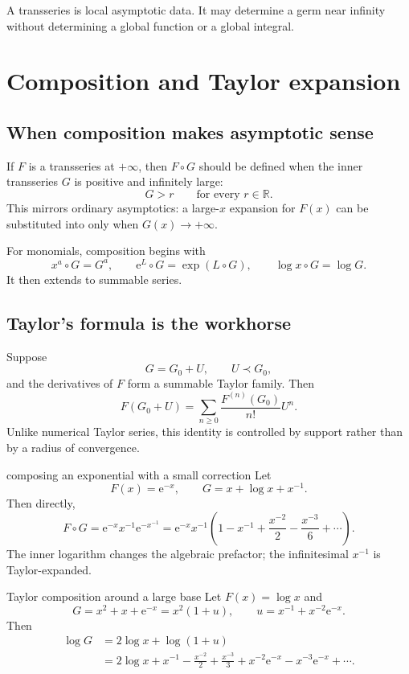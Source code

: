 \documentclass[11pt,openany]{book}
\theoremstyle{plain}
\theoremstyle{definition}
\theoremstyle{remark}
\newcommand{\R}{\mathbb{R}}
\newcommand{\e}{\mathrm{e}}
\begin{document}
\begin{warningbox}
A transseries is local asymptotic data. It may determine a germ near infinity without determining a global function or a global integral.
\end{warningbox}

\chapter{Composition and Taylor expansion}
\label{chap:composition}

\section{When composition makes asymptotic sense}
If $F$ is a transseries at $+\infty$, then $F\circ G$ should be defined when the inner transseries $G$ is positive and infinitely large:
\[
  G>r\qquad\text{for every }r\in\R.
\]
This mirrors ordinary asymptotics: a large-$x$ expansion for $F(x)$ can be substituted into only when $G(x)\to+\infty$.

For monomials, composition begins with
\[
  x^a\circ G=G^a,
  \qquad
  \e^L\circ G=\exp(L\circ G),
  \qquad
  \log x\circ G=\log G.
\]
It then extends to summable series.

\section{Taylor's formula is the workhorse}
Suppose
\[
  G=G_0+U,
  \qquad U\prec G_0,
\]
and the derivatives of $F$ form a summable Taylor family. Then
\[
  F(G_0+U)=
  \sum_{n\ge0}\frac{F^{(n)}(G_0)}{n!}U^n.
\]
Unlike numerical Taylor series, this identity is controlled by support rather than by a radius of convergence.

\begin{workedbox}{composing an exponential with a small correction}
Let
\[
  F(x)=\e^{-x},
  \qquad G=x+\log x+x^{-1}.
\]
Then directly,
\[
  F\circ G
  =\e^{-x}x^{-1}\e^{-x^{-1}}
  =\e^{-x}x^{-1}
   \left(1-x^{-1}+\frac{x^{-2}}2-\frac{x^{-3}}6+\cdots\right).
\]
The inner logarithm changes the algebraic prefactor; the infinitesimal $x^{-1}$ is Taylor-expanded.
\end{workedbox}

\begin{workedbox}{Taylor composition around a large base}
Let $F(x)=\log x$ and
\[
  G=x^2+x+\e^{-x}=x^2(1+u),
  \qquad u=x^{-1}+x^{-2}\e^{-x}.
\]
Then
\begin{align*}
  \log G
  &=2\log x+\log(1+u)\\
  &=2\log x+x^{-1}-\frac{x^{-2}}2
    +\frac{x^{-3}}3+ x^{-2}\e^{-x}
    -x^{-3}\e^{-x}+\cdots.
\end{align*}
\end{workedbox}
\end{document}
